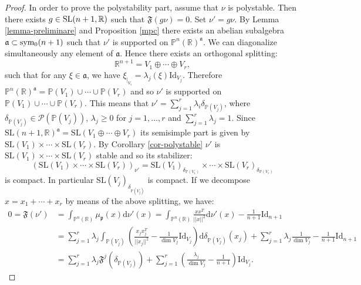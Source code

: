 \documentclass[leqno,11pt, a4]{amsart}
\theoremstyle{named}
\begin{document}
\begin{proof}
In order to prove the polystability part, assume that $\nu$ is polystable. Then there exists $g\in {\rm SL}(n+1,{\mathbb{R}})$ such that ${\mathfrak{F}} (g\nu)=0$. Set $\nu'=g\nu$.  By Lemma \ref{lemma-preliminare} and Proposition \ref{mpc} there exists an abelian subalgebra ${\mathfrak{a}} \subset {\rm sym_0}(n+1)$ such that $\nu'$ is supported on $\mathds{P}^n ({\mathbb{R}})^{\mathfrak{a}}$. We can diagonalize simultaneously any element of ${\mathfrak{a}}$. Hence there exists an orthogonal  splitting:
\[
{\mathbb{R}}^{n+1}=V_1 \oplus \cdots \oplus V_r,
\]
such that for any $\xi \in {\mathfrak{a}}$, we have $\xi_{|_{V_i}}=\lambda_j (\xi) \mathrm{Id}_{V_j}$. Therefore
$\mathds{P}^n ({\mathbb{R}})^{\mathfrak{a}}=\mathds{P}(V_1)\cup \cdots \cup \mathds{P}(V_r)$ and so $\nu'$ is supported on $\mathds{P}(V_1)\cup \cdots \cup \mathds{P}(V_r)$. This means that
$\nu'=\sum_{j=1}^r \lambda_i \delta_{\mathds{P}(V_j)}$, where $\delta_{\mathds{P}(V_j)} \in {\mathscr{P}} (\mathds{P}(V_j))$, $\lambda_j \geq 0$ for $j=1,\ldots,r$ and $\sum_{j=1}^r \lambda_j=1$. Since $\mathrm{SL}(n+1,{\mathbb{R}})^{\mathfrak{a}}=\mathrm{SL}(V_1 \oplus \cdots \oplus V_r)$ its semisimple part is given by
$\mathrm{SL} (V_1) \times \cdots \times\mathrm{SL} (V_r )$. By Corollary \ref{cor-polystable} $\nu'$ is $\mathrm{SL} (V_1) \times \cdots \times \mathrm{SL} (V_r )$ stable and so its stabilizer:
\[
(\mathrm{SL} (V_1) \times \cdots \times \mathrm{SL} (V_r ))_{\nu'}=\mathrm{SL} (V_1)_{ \delta_{\mathds{P}(V_1)}}\times \cdots \times \mathrm{SL} (V_r)_{ \delta_{\mathds{P}(V_r)}}
\]
is compact. In particular $\mathrm{SL} (V_j)_{ \delta_{\mathds{P}(V_j)}}$ is compact.
If we decompose $x=x_1+\cdots +x_r$ by means of the above splitting, we have:
\[
\begin{split}
0={\mathfrak{F}} (\nu') &= \int_{\mathds{P}^n ({\mathbb{R}}) } {\mu_{\mathfrak{p}}}(x)  \mathrm{d}\nu'(x)= \int_{\mathds{P}^n ({\mathbb{R}})} \frac{xx^T}{|| x ||^2}  \mathrm{d} \nu'(x) - \frac{1}{n+1}\mathrm{Id}_{n+1}\\
&=\sum_{j=1}^r \lambda_j \int_{\mathds{P}(V_j)} \left(\frac{x_jx_j^{T}}{|| x_j ||^2} - \frac{1}{\dim V_j}\mathrm{Id}_{V_j}\right)  \mathrm{d} \delta_{\mathds{P}(V_j)}(x_j) +\sum_{j=1}^r \lambda_j \frac{1}{\dim V_j} -\frac{1}{n+1} \mathrm{Id}_{n+1} \\
&=\sum_{j=1}^r \lambda_j {\mathfrak{F}}^j (\delta_{\mathds{P}(V_j)}) + \sum_{j=1}^r \left(\frac{\lambda_j}{\dim V_j} - \frac{1}{n+1}\right)\mathrm{Id}_{V_j}.
\end{split}
\]


\end{proof}
\end{document}
